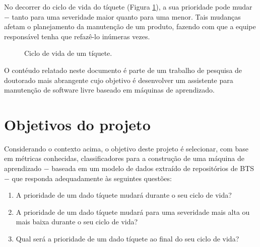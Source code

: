\documentclass[11pt,twoside]{article}
\begin{document}
	No decorrer do ciclo de vida do tíquete (Figura \ref{fig:ciclo-de-vida}), a sua prioridade pode mudar $-$ tanto para uma severidade maior quanto para uma menor. Tais mudanças afetam o planejamento da manutenção de um produto, fazendo com que a equipe responsável tenha que refazê-lo inúmeras vezes.

	\begin{figure}[hbt!]  
  \centering
  \caption{Ciclo de vida de um tíquete\cite{SOM}.}
  \label{fig:ciclo-de-vida}
\end{figure}

%  
O contéudo relatado neste documento é parte de um trabalho de pesquisa de doutorado mais abrangente cujo objetivo é desenvolver um assistente 
para manutenção de software livre baseado em máquinas de aprendizado.

\section{Objetivos do projeto}
Considerando o contexto acima, o objetivo deste projeto é selecionar, com base em métricas conhecidas\cite{JON}, classificadores para a construção de uma máquina de aprendizado $-$ baseada 
em um modelo de dados extraído de repositórios de BTS $-$ que responda adequadamente às seguintes questões:
	\begin{enumerate}[Q1.]
  		\item A prioridade de um dado tíquete mudará durante o seu ciclo de vida?
  		\item A prioridade de um dado tíquete mudará para uma severidade mais alta ou mais baixa durante o seu ciclo de vida?
  		\item Qual será a prioridade de um dado tíquete ao final do seu ciclo de vida?
	\end{enumerate}
	
\end{document}
